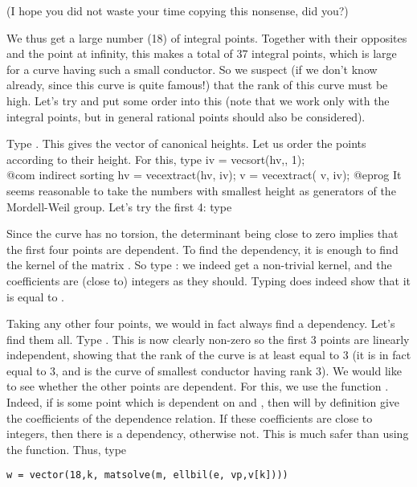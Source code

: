 (I hope you did not waste your time copying this nonsense, did you?)

We thus get a large number (18) of integral points. Together with their
opposites and the point at infinity, this makes a total of 37 integral
points, which is large for a curve having such a small conductor. So we
suspect (if we don't know already, since this curve is quite famous!) that
the rank of this curve must be high. Let's try and put some order into this
(note that we work only with the integral points, but in general rational
points should also be considered).

Type . This gives the vector of canonical heights.
Let us order the points according to their height. For this, type
\bprog
  iv = vecsort(hv,, 1);    \\@com indirect sorting
  hv = vecextract(hv, iv);
  v  = vecextract( v, iv);
@eprog
\noindent
It seems reasonable to take the numbers with smallest height as generators of
the Mordell-Weil group. Let's try the first 4: type


Since the curve has no torsion, the determinant being close to zero implies
that the first four points are dependent. To find the dependency, it is
enough to find the kernel of the matrix . So type :
we indeed get a non-trivial kernel, and the coefficients are (close to)
integers as they should. Typing  does indeed show
that it is equal to .

Taking any other four points, we would in fact always find a dependency.
Let's find them all. Type . This is now clearly non-zero so the first 3 points
are linearly independent, showing that the rank of the curve is at least
equal to 3 (it is in fact equal to 3, and  is the curve of smallest
conductor having rank 3). We would like to see whether the other points are
dependent. For this, we use the function . Indeed, if  is
some point which is dependent on  and , then
 will by definition give the coefficients
of the dependence relation. If these coefficients are close to integers, then
there is a dependency, otherwise not.  This is much safer than using the
 function. Thus, type

\centerline{\tt w = vector(18,k, matsolve(m, ellbil(e, vp,v[k])))}

